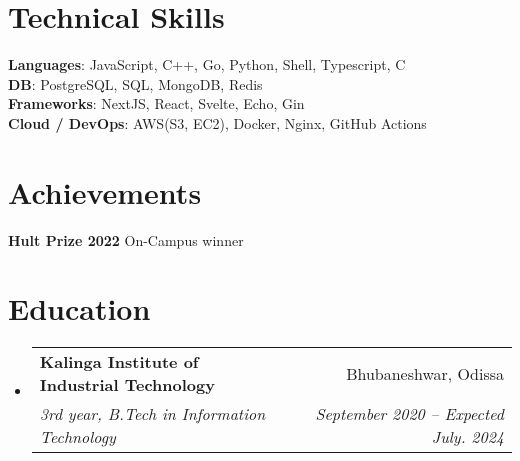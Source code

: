 \documentclass[letterpaper,11pt]{article}
\makeatletter
\newcommand{\resumeSubheading}[4]{
  \vspace{-2pt}\item
    \begin{tabular*}{0.97\textwidth}[t]{l@{\extracolsep{\fill}}r}
      \textbf{#1} & #2 \\
      \textit{\small#3} & \textit{\small #4} \\
    \end{tabular*}\vspace{-7pt}
}
\newcommand{\resumeSubHeadingListStart}{\begin{itemize}[leftmargin=0.15in, label={}]}
\newcommand{\resumeSubHeadingListEnd}{\end{itemize}}
\makeatother
\begin{document}
\section{Technical Skills}
\begin{itemize}[leftmargin=0.15in, label={}]
	\small{\item{
		\textbf{Languages}{: JavaScript, C++, Go, Python, Shell, Typescript, C } \\
		\textbf{DB}{: PostgreSQL, SQL, MongoDB, Redis } \\
		\textbf{Frameworks}{: NextJS, React, Svelte, Echo, Gin  } \\
		\textbf{Cloud / DevOps}{: AWS(S3, EC2), Docker, Nginx, GitHub Actions } \\
	}}
\end{itemize}
 

\section{Achievements}
\begin{itemize}[leftmargin=0.15in, label={}]
	\small{\item{
		\textbf{Hult Prize 2022}{ On-Campus winner } \\
	}}
\end{itemize}
 
\section{Education}
\resumeSubHeadingListStart
\resumeSubheading
{Kalinga Institute of Industrial Technology}{Bhubaneshwar, Odissa}
{3rd year, B.Tech in Information Technology}{September 2020 -- Expected July. 2024}
\resumeSubHeadingListEnd
\end{document}
